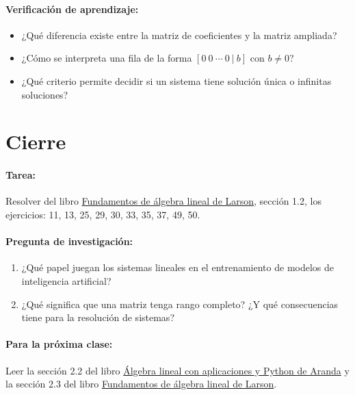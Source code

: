 \documentclass[a4,11pt]{aleph-notas}
\begin{document}
\paragraph{Verificación de aprendizaje:}
\begin{itemize}[leftmargin=*]
    \item ¿Qué diferencia existe entre la matriz de coeficientes y la matriz ampliada?
    \item ¿Cómo se interpreta una fila de la forma $[0\ 0\ \cdots\ 0\ |\ b]$ con $b\neq 0$?
    \item ¿Qué criterio permite decidir si un sistema tiene solución única o infinitas soluciones?
\end{itemize}

\section*{Cierre}

\paragraph{Tarea:}  
Resolver del libro \href{https://catalogobiblioteca.puce.edu.ec/cgi-bin/koha/opac-detail.pl?biblionumber=86081}{Fundamentos de álgebra lineal de Larson}, sección 1.2, los ejercicios: 11, 13, 25, 29, 30, 33, 35, 37, 49, 50.

\paragraph{Pregunta de investigación:}
\begin{enumerate}[leftmargin=*]
    \item ¿Qué papel juegan los sistemas lineales en el entrenamiento de modelos de inteligencia artificial?
    \item ¿Qué significa que una matriz tenga rango completo? ¿Y qué consecuencias tiene para la resolución de sistemas?
\end{enumerate}

\paragraph{Para la próxima clase:}  
Leer la sección 2.2 del libro \href{https://catalogobiblioteca.puce.edu.ec/cgi-bin/koha/opac-detail.pl?biblionumber=283260}{Álgebra lineal con aplicaciones y Python de Aranda} y la sección 2.3 del libro \href{https://catalogobiblioteca.puce.edu.ec/cgi-bin/koha/opac-detail.pl?biblionumber=86081}{Fundamentos de álgebra lineal de Larson}.
\end{document}
